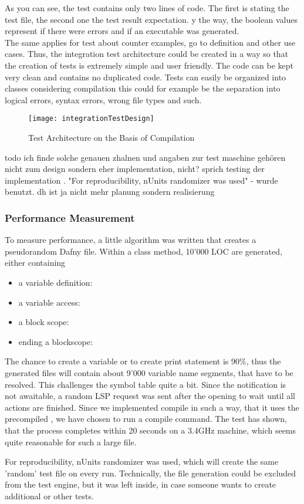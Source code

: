 As you can see, the test contains only two lines of code.
The first is stating the test file, the second one the test result expectation.
 y the way, the boolean values represent if there were errors and if an executable was generated.\\
The same applies for test about counter examples, go to definition and other use cases.
Thus, the integration test architecture could be created in a way so that the creation of tests is extremely simple and user friendly.
The code can be kept very clean and contains no duplicated code.
Tests can easily be organized into classes \textendash{} considering compilation this could for example be the separation into logical errors, syntax errors, wrong file types and such.

\begin{figure}[H]
    \centering
    \texttt{[image: integrationTestDesign]}
    \caption{Test Architecture on the Basis of Compilation}
    \label{fig:testArchitecture}
\end{figure}

todo ich finde solche genauen zhalnen und angaben zur test maschine gehören nicht zum design
sondern eher implementation, nicht? sprich testing der implementation .
"For reproducibility, nUnits randomizer was used"
- wurde benutzt. dh ist ja nicht mehr planung sondern realisierung


\subsubsection{Performance Measurement}
To measure performance, a little algorithm was written that creates a pseudorandom Dafny file.
Within a class method, 10'000 LOC are generated, either containing
\begin{itemize}
    \item a variable definition: 
    \item a variable access: 
    \item a block scope: 
    \item ending a blockscope: \code{\}}
\end{itemize}
The chance to create a variable or to create print statement is 90\%, thus the generated files will contain about 9'000 variable name segments, that have to be resolved.
This challenges the symbol table quite a bit.
Since the  notification is not awaitable, a random LSP request was sent after the opening to wait until all actions are finished.
Since we implemented compile in such a way, that it uses the precompiled , we have chosen to run a compile command.
The test has shown, that the process completes within 20 seconds on a 3.4GHz machine, which seems quite reasonable for such a large file.

For reproducibility, nUnits randomizer was used, which will create the same 'random' test file on every run.
Technically, the file generation could be excluded from the test engine, but it was left inside, in case someone wants to create additional or other tests.
